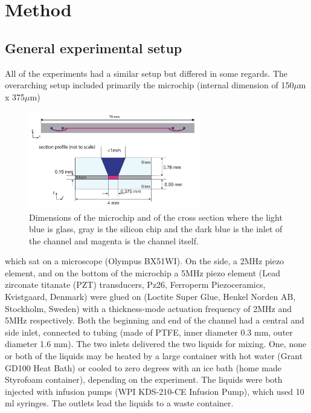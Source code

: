 \documentclass[twoside,twocolumn,9pt,a4paper]{IEEEtran}
\begin{document}

\section{Method} \label{secAfibMethods}

\subsection{General experimental setup}

All of the experiments had a similar setup but differed in some regards. The overarching setup included primarily the microchip (internal dimension of 150$\mu$m x 375$\mu$m) 

\begin{figure}[h]
\begin{center}
\includegraphics[width=7.5cm]{Images/Updated_figure1.png} %
\caption{Dimensions of the microchip and of the cross section where the light blue is glass, gray is the silicon chip and the dark blue is the inlet of the channel and magenta is the channel itself. }
\label{DimensionMicrochip}
\end{center}
\end{figure} %

which sat on a microscope (Olympus BX51WI). On the side, a 2MHz piezo element, and on the bottom of the microchip a 5MHz piezo element (Lead zirconate titanate (PZT) transducers, Pz26, Ferroperm Piezoceramics, Kvistgaard, Denmark) were glued on (Loctite Super Glue, Henkel Norden AB, Stockholm, Sweden) with a thickness-mode actuation frequency of 2MHz and 5MHz respectively. Both the beginning and end of the channel had a central and side inlet, connected to tubing (made of PTFE, inner diameter 0.3 mm, outer diameter 1.6 mm). The two inlets delivered the two liquids for mixing. One, none or both of the liquids may be heated by a large container with hot water (Grant GD100 Heat Bath) or cooled to zero degrees with an ice bath (home made Styrofoam container), depending on the experiment. The liquids were both injected with infusion pumps (WPI KDS-210-CE Infusion Pump), which used 10 ml syringes. The outlets lead the liquids to a waste container.  
\end{document}
